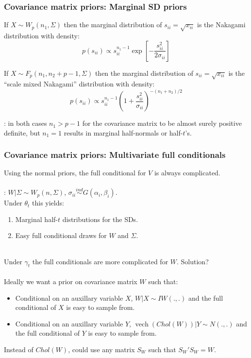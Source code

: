 \documentclass[xcolor=dvipsnames]{beamer}
\DeclareMathOperator{\vech}{vech}
\begin{document}
\begin{frame}
\frametitle{Covariance matrix priors: Marginal SD priors}
If $X\sim W_p(n_1,\Sigma)$ then the marginal distribution of $s_{ii}=\sqrt{x_{ii}}$ is the Nakagami distribution with density:
\[
p(s_{ii})\propto s_{ii}^{n_1-1}\exp\left[-\frac{s_{ii}^2}{2\sigma_{ii}}\right]
\]

\pause If $X\sim F_p(n_1, n_2 + p - 1, \Sigma)$ then the marginal distribution of $s_{ii}=\sqrt{x_{ii}}$ is the ``scale mixed Nakagami'' distribution with density:
\[
p(s_{ii})\propto s_{ii}^{n_1 - 1}\left(1 + \frac{s_{ii}^2}{\sigma_{ii}}\right)^{-(n_1 + n_2)/2}
\]

: in both cases $n_1 > p - 1$ for the covariance matrix to be almost surely positive definite, but $n_1=1$ results in marginal half-normals or half-$t$'s.
\end{frame}

\begin{frame}
\frametitle{Covariance matrix priors: Multivariate full conditionals}
Using the normal priors, the full conditional for $V$ is always complicated.\\~\\

\pause\citet{huang2013simple}: $W|\Sigma\sim W_p(n,\Sigma)$, $\sigma_{ii}\stackrel{ind}{\sim} G(\alpha_i,\beta_i)$. \\

Under $\theta_t$ this yields:
\begin{enumerate}
\item Marginal half-$t$ distributions for the SDs.
\item Easy full conditional draws for $W$ and $\Sigma$.\\~
\end{enumerate}

\pause Under $\gamma_t$ the full conditionals are more complicated for $W$.  Solution?\\~\\

\pause Ideally we want a prior on covariance matrix $W$ such that:
\begin{itemize}
\item Conditional on an auxillary variable $X$, $W|X \sim IW(.,.)$ and the full conditional of $X$ is easy to sample from.
\item Conditional on an auxillary variable $Y$, $\vech(Chol(W))|Y \sim N(.,.)$ and the full conditional of $Y$ is easy to sample from.
\end{itemize}
\pause Instead of $Chol(W)$, could use any matrix $S_W$ such that $S_W'S_W=W$.
\end{frame}
\end{document}

